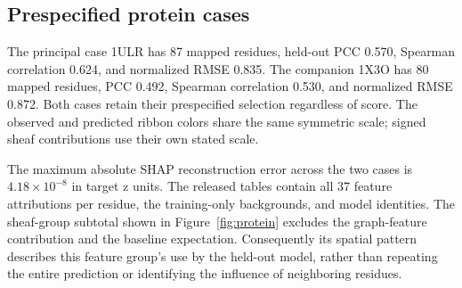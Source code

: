 \subsection{Prespecified protein cases}
The principal case 1ULR has 87 mapped residues, held-out PCC 0.570, Spearman correlation 0.624, and normalized RMSE 0.835. The companion 1X3O has 80 mapped residues, PCC 0.492, Spearman correlation 0.530, and normalized RMSE 0.872. Both cases retain their prespecified selection regardless of score. The observed and predicted ribbon colors share the same symmetric scale; signed sheaf contributions use their own stated scale.

The maximum absolute SHAP reconstruction error across the two cases is $4.18\times10^{-8}$ in target z units. The released tables contain all 37 feature attributions per residue, the training-only backgrounds, and model identities. The sheaf-group subtotal shown in Figure~\ref{fig:protein} excludes the graph-feature contribution and the baseline expectation. Consequently its spatial pattern describes this feature group's use by the held-out model, rather than repeating the entire prediction or identifying the influence of neighboring residues.

